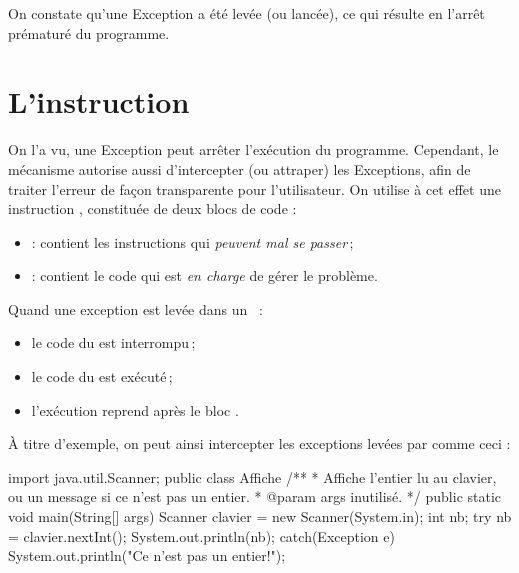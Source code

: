 On constate qu'une Exception a été levée (ou \og lancée\fg), ce qui résulte en l'arrêt prématuré du programme.


\section{L'instruction }
On l'a vu, une Exception peut arrêter l'exécution du programme. Cependant, le mécanisme autorise aussi d'intercepter (ou \og attraper\fg) les Exceptions, afin de traiter l'erreur de façon transparente pour l'utilisateur. On utilise à cet effet une instruction , constituée de deux blocs de code :
\begin{itemize}
\item {} : contient les instructions qui \emph{peuvent mal se passer}\,;
\item {} : contient le code qui est \emph{en charge} de gérer le problème.
\end{itemize}

Quand une exception est levée dans un ~:
\begin{itemize}
\item le code du  est interrompu\,;
\item le code du  est exécuté\,;
\item l'exécution reprend après le bloc .
\end{itemize}

À titre d'exemple, on peut ainsi intercepter les exceptions levées par  comme ceci :
\begin{java}
import java.util.Scanner;
public class Affiche {
  /**
   * Affiche l'entier lu au clavier, ou un message si ce n'est pas un entier.
   * @param args inutilisé.
   */
  public static void main(String[] args) {
      Scanner clavier = new Scanner(System.in);
      int nb;
      try { 
        nb = clavier.nextInt();
        System.out.println(nb);
      }
      catch(Exception e) { 
        System.out.println("Ce n'est pas un entier!");
      }
  }
}
\end{java}

